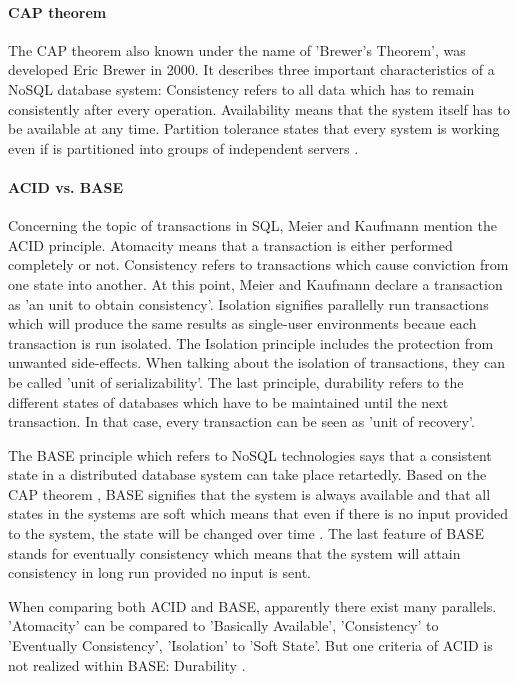 \paragraph{CAP theorem} \label{CAP}

The \ac{CAP} theorem \cite[p.15 ff.]{mongodb_edward} also known under the name of  'Brewer's Theorem', was developed Eric Brewer in 2000. It describes three important characteristics of a NoSQL database system: Consistency refers to all data which has to remain consistently after every operation. Availability means that the system itself has to be available at any time. Partition tolerance states that every system is working even if is partitioned into groups of independent servers \cite[p.15 ff.]{mongodb_edward}.

\paragraph{ACID vs. BASE}

Concerning the topic of transactions in SQL, Meier and Kaufmann \cite[p.136 ff.]{nosql_meier} mention the \ac{ACID} principle. Atomacity means that a transaction is either performed completely or not. Consistency refers to transactions which cause conviction from one state into another. At this point, Meier and Kaufmann declare a transaction as 'an unit to obtain consistency'. Isolation signifies parallelly run transactions which will produce the same results as single-user environments becaue each transaction is run isolated. The Isolation principle includes the protection from unwanted side-effects. When talking about the isolation of transactions, they can be called 'unit of serializability'. The last principle, durability refers to the different states of databases which have to be maintained until the next transaction. In that case, every transaction can be seen as 'unit of recovery'.

The \ac{BASE} principle which refers to NoSQL technologies says that a consistent state in a distributed database system can take place retartedly. Based on the CAP theorem \pageref{CAP}, BASE signifies that the system is always available and that all states in the systems are soft which means that even if there is no input provided to the system, the state will be changed over time \cite[p.15 ff.]{mongodb_edward}. The last feature of BASE stands for eventually consistency which means that the system will attain consistency in long run provided no input is sent.

When comparing both ACID and BASE, apparently there exist many parallels. 'Atomacity' can be compared to 'Basically Available', 'Consistency' to 'Eventually Consistency', 'Isolation' to 'Soft State'. But one criteria of ACID is not realized within BASE: Durability \cite[p.1 ff.]{mongodb_edward}.

